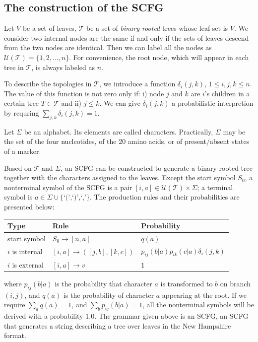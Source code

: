 \documentclass[pdftex,11pt]{article}
\begin{document}
\subsection{The construction of the SCFG}
Let $V$ be a set of leaves, $\mathcal{T}$ be a set of {\it binary
  rooted} trees whose leaf set is $V$. We consider two internal nodes
are the same if and only if the sets of leaves descend from the two
nodes are identical. Then we can label all the nodes as
$\mathcal{U}(\mathcal{T})=\{1,2,\ldots,n\}$. For convenience, the root
node, which will appear in each tree in $\mathcal{T}$, is always labeled
as $n$.

To describe the topologies in $\mathcal{T}$, we introduce a function
$\delta_i(j,k)$, $1\leq i,j,k\leq n$.  The value of this function is not
zero only if: i) node $j$ and $k$ are $i$'s children in a certain tree
$T\in\mathcal{T}$ and ii) $j\leq k$. We can give $\delta_i(j,k)$ a
probabilistic interpretion by requring $\sum_{j,k}\delta_i(j,k)=1$.

Let $\Sigma$ be an alphabet. Its elements are called
characters. Practically, $\Sigma$ may be the set of the four
nucleotides, of the 20 amino acids, or of present/absent states of a
marker.

Based on $\mathcal{T}$ and $\Sigma$, an SCFG can be constructed to
generate a binary rooted tree together with the characters assigned to
the leaves.  Except the start symbol $S_0$, a nonterminal symbol of the
SCFG is a pair $[i,a]\in \mathcal{U}(\mathcal{T})\times\Sigma$; a
terminal symbol is $a\in\Sigma\cup\{\mbox{`(',`)',`,'}\}$. The
production rules and their probabilities are presented below:
\begin{center}
\begin{tabular}{lll}
  \hline
  Type & Rule & Probability \\
  \hline
  start symbol & $S_0\rightarrow[n,a]$ & $q(a)$ \\
  $i$ is internal & $[i,a]\rightarrow([j,b],[k,c])$ & $p_{ij}(b|a)p_{ik}(c|a)\delta_i(j,k)$ \\
  $i$ is external & $[i,a]\rightarrow v$ & $1$ \\
  \hline
\end{tabular}
\end{center}
where $p_{ij}(b|a)$ is the probability that character $a$ is transformed
to $b$ on branch $(i,j)$, and $q(a)$ is the probability of character $a$
appearing at the root. If we require \mbox{$\sum_a q(a)=1$}, and $\sum_b
p_{ij}(b|a)=1$, all the nonterminal symbols will be derived with a
probability $1.0$. The grammar given above is an SCFG, an SCFG that
generates a string describing a tree over leaves in the New Hampshire
format.
\end{document}
